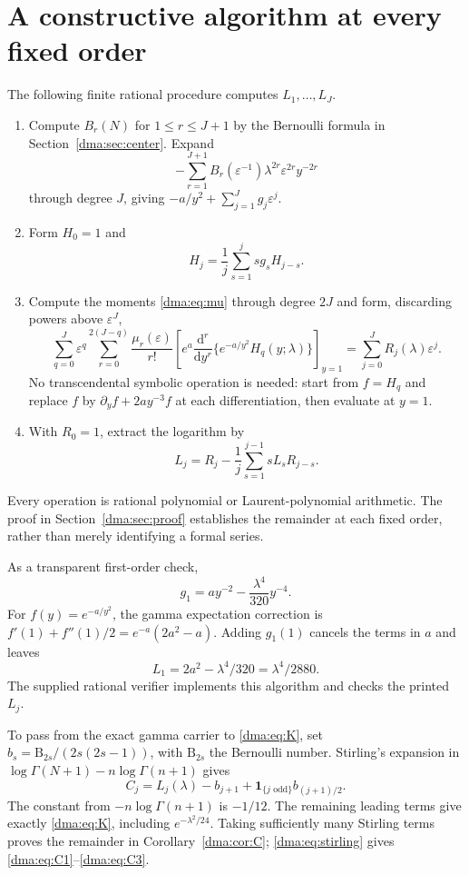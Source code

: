 \documentclass[11pt,letterpaper]{article}
\theoremstyle{remark}\newtheorem{remark}[theorem]{Remark}
\newcommand{\dd}{\mathrm d}
\begin{document}
\section{A constructive algorithm at every fixed order}\label{dma:sec:algorithm}
The following finite rational procedure computes $L_1,\ldots,L_J$.
\begin{enumerate}[label=\arabic*.]
\item Compute $B_r(N)$ for $1\leq r\leq J+1$ by the Bernoulli formula in Section~\ref{dma:sec:center}. Expand
\[
-\sum_{r=1}^{J+1}B_r(\varepsilon^{-1})\lambda^{2r}\varepsilon^{2r}y^{-2r}
\]
through degree $J$, giving $-a/y^2+\sum_{j=1}^Jg_j\varepsilon^j$.
\item Form $H_0=1$ and
\begin{equation}\label{dma:eq:H}
 H_j=\frac1j\sum_{s=1}^j s g_s H_{j-s}.
\end{equation}
\item Compute the moments \eqref{dma:eq:mu} through degree $2J$ and form, discarding powers above $\varepsilon^J$,
\begin{equation}\label{dma:eq:algorithm}
 \sum_{q=0}^J\varepsilon^q\sum_{r=0}^{2(J-q)}\frac{\mu_r(\varepsilon)}{r!}
 \left[e^a\frac{\dd^r}{\dd y^r}
 \{e^{-a/y^2}H_q(y;\lambda)\}\right]_{y=1}
 =\sum_{j=0}^JR_j(\lambda)\varepsilon^j.
\end{equation}
No transcendental symbolic operation is needed: start from $f=H_q$ and replace
$f$ by $\partial_y f+2ay^{-3}f$ at each differentiation, then evaluate at $y=1$.
\item With $R_0=1$, extract the logarithm by
\begin{equation}\label{dma:eq:logrec}
 L_j=R_j-\frac1j\sum_{s=1}^{j-1}s L_sR_{j-s}.
\end{equation}
\end{enumerate}
Every operation is rational polynomial or Laurent-polynomial arithmetic. The proof in Section~\ref{dma:sec:proof} establishes the remainder at each fixed order, rather than merely identifying a formal series.

As a transparent first-order check,
\[
 g_1=ay^{-2}-\frac{\lambda^4}{320}y^{-4}.
\]
For $f(y)=e^{-a/y^2}$, the gamma expectation correction is
$f'(1)+f''(1)/2=e^{-a}(2a^2-a)$. Adding $g_1(1)$ cancels the terms in $a$ and leaves
\[
 L_1=2a^2-\lambda^4/320=\lambda^4/2880.
\]
The supplied rational verifier implements this algorithm and checks the printed $L_j$.

To pass from the exact gamma carrier to \eqref{dma:eq:K}, set
$b_s=\mathrm B_{2s}/(2s(2s-1))$, with $\mathrm B_{2s}$ the Bernoulli number. Stirling's expansion in
$\log\Gamma(N+1)-n\log\Gamma(n+1)$ gives
\begin{equation}\label{dma:eq:stirling}
 C_j=L_j(\lambda)-b_{j+1}+\mathbf{1}_{\{j\text{ odd}\}}b_{(j+1)/2}.
\end{equation}
The constant from $-n\log\Gamma(n+1)$ is $-1/12$. The remaining leading terms give exactly \eqref{dma:eq:K}, including $e^{-\lambda^2/24}$. Taking sufficiently many Stirling terms proves the remainder in Corollary~\ref{dma:cor:C}; \eqref{dma:eq:stirling} gives \eqref{dma:eq:C1}--\eqref{dma:eq:C3}.
\end{document}
